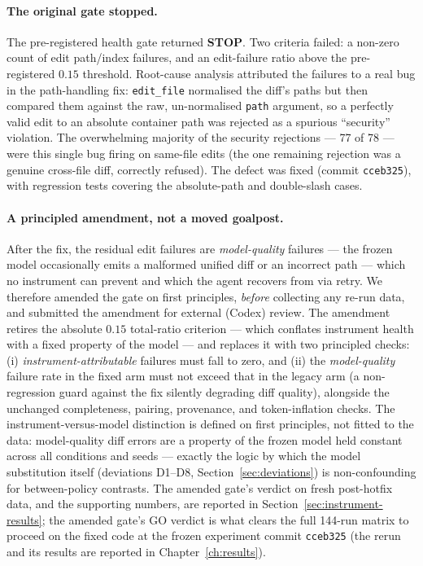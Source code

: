 \paragraph{The original gate stopped.}
The pre-registered health gate returned \textbf{STOP}. Two criteria failed: a non-zero count
of edit path/index failures, and an edit-failure ratio above the pre-registered $0.15$
threshold. Root-cause analysis attributed the failures to a real bug in the path-handling
fix: \texttt{edit\_file} normalised the diff's paths but then compared them against the raw,
un-normalised \texttt{path} argument, so a perfectly valid edit to an absolute container path
was rejected as a spurious ``security'' violation. The overwhelming majority of the security
rejections --- 77 of 78 --- were this single bug firing on same-file edits (the one remaining
rejection was a genuine cross-file diff, correctly refused). The defect was fixed (commit
\texttt{cceb325}), with regression tests covering the absolute-path and double-slash cases.

\paragraph{A principled amendment, not a moved goalpost.}
After the fix, the residual edit failures are \emph{model-quality} failures --- the frozen
model occasionally emits a malformed unified diff or an incorrect path --- which no
instrument can prevent and which the agent recovers from via retry. We therefore amended the
gate on first principles, \emph{before} collecting any re-run data, and submitted the
amendment for external (Codex) review. The amendment retires the absolute $0.15$
total-ratio criterion --- which conflates instrument health with a fixed property of the
model --- and replaces it with two principled checks: (i) \emph{instrument-attributable}
failures must fall to zero, and (ii) the \emph{model-quality} failure rate in the fixed arm
must not exceed that in the legacy arm (a non-regression guard against the fix silently
degrading diff quality), alongside the unchanged completeness, pairing, provenance, and
token-inflation checks. The instrument-versus-model distinction is defined on first
principles, not fitted to the data: model-quality diff errors are a property of the frozen
model held constant across all conditions and seeds --- exactly the logic by which the
model substitution itself (deviations D1--D8, Section~\ref{sec:deviations}) is
non-confounding for between-policy contrasts. The amended gate's verdict on fresh
post-hotfix data, and the supporting numbers, are reported in
Section~\ref{sec:instrument-results}; the amended gate's GO verdict is what clears the full
144-run matrix to proceed on the fixed code at the frozen experiment commit \texttt{cceb325}
(the rerun and its results are reported in Chapter~\ref{ch:results}).
